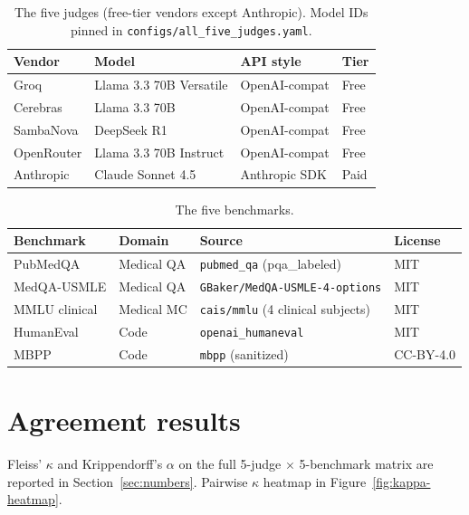 \documentclass[11pt,a4paper]{article}
\begin{document}
\begin{table}[ht]
\centering
\caption{The five judges (free-tier vendors except Anthropic). Model IDs pinned in
\texttt{configs/all\_five\_judges.yaml}.}
\label{tab:judges}
\begin{tabular}{llll}
\toprule
Vendor & Model & API style & Tier \\
\midrule
Groq        & Llama 3.3 70B Versatile & OpenAI-compat & Free \\
Cerebras    & Llama 3.3 70B           & OpenAI-compat & Free \\
SambaNova   & DeepSeek R1             & OpenAI-compat & Free \\
OpenRouter  & Llama 3.3 70B Instruct  & OpenAI-compat & Free \\
Anthropic   & Claude Sonnet 4.5       & Anthropic SDK & Paid \\
\bottomrule
\end{tabular}
\end{table}

\begin{table}[ht]
\centering
\caption{The five benchmarks.}
\label{tab:benchmarks}
\begin{tabular}{llll}
\toprule
Benchmark & Domain & Source & License \\
\midrule
PubMedQA      & Medical QA   & \texttt{pubmed\_qa} (pqa\_labeled)            & MIT \\
MedQA-USMLE   & Medical QA   & \texttt{GBaker/MedQA-USMLE-4-options}         & MIT \\
MMLU clinical & Medical MC   & \texttt{cais/mmlu} (4 clinical subjects)      & MIT \\
HumanEval     & Code         & \texttt{openai\_humaneval}                    & MIT \\
MBPP          & Code         & \texttt{mbpp} (sanitized)                     & CC-BY-4.0 \\
\bottomrule
\end{tabular}
\end{table}

\section{Agreement results}
Fleiss' $\kappa$ and Krippendorff's $\alpha$ on the full 5-judge $\times$ 5-benchmark
matrix are reported in Section~\ref{sec:numbers}. Pairwise $\kappa$ heatmap in
Figure~\ref{fig:kappa-heatmap}.
\end{document}
